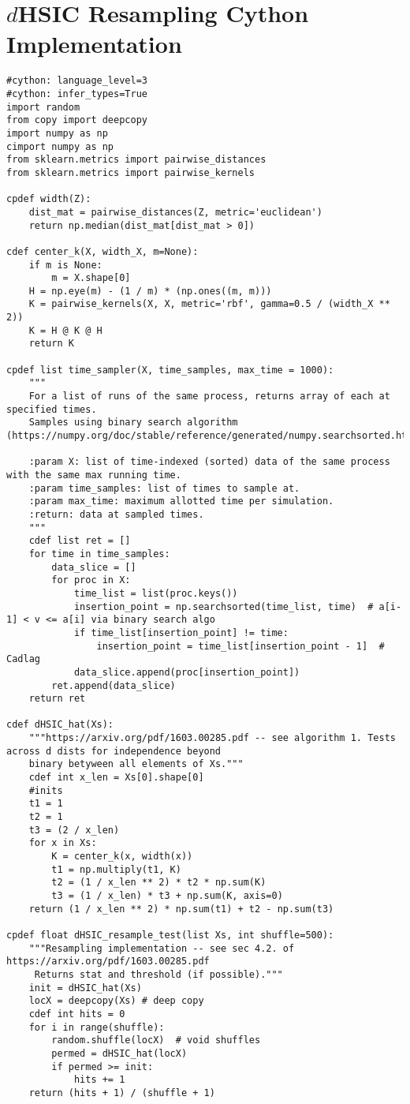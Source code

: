 
\chapter{$d$HSIC Resampling Cython Implementation}\label{sec:sic}

\begin{lstlisting}[label={lst:cyhsic}, language=Cython, style=mystyle]
#cython: language_level=3
#cython: infer_types=True
import random
from copy import deepcopy
import numpy as np
cimport numpy as np
from sklearn.metrics import pairwise_distances
from sklearn.metrics import pairwise_kernels

cpdef width(Z):
    dist_mat = pairwise_distances(Z, metric='euclidean')
    return np.median(dist_mat[dist_mat > 0])

cdef center_k(X, width_X, m=None):
    if m is None:
        m = X.shape[0]
    H = np.eye(m) - (1 / m) * (np.ones((m, m)))
    K = pairwise_kernels(X, X, metric='rbf', gamma=0.5 / (width_X ** 2))
    K = H @ K @ H
    return K

cpdef list time_sampler(X, time_samples, max_time = 1000):
    """
    For a list of runs of the same process, returns array of each at specified times.
    Samples using binary search algorithm (https://numpy.org/doc/stable/reference/generated/numpy.searchsorted.html).
    
    :param X: list of time-indexed (sorted) data of the same process with the same max running time.
    :param time_samples: list of times to sample at.
    :param max_time: maximum allotted time per simulation.
    :return: data at sampled times.
    """
    cdef list ret = []
    for time in time_samples:
        data_slice = []
        for proc in X:
            time_list = list(proc.keys())
            insertion_point = np.searchsorted(time_list, time)  # a[i-1] < v <= a[i] via binary search algo
            if time_list[insertion_point] != time:
                insertion_point = time_list[insertion_point - 1]  # Cadlag
            data_slice.append(proc[insertion_point])
        ret.append(data_slice)
    return ret

cdef dHSIC_hat(Xs):
    """https://arxiv.org/pdf/1603.00285.pdf -- see algorithm 1. Tests across d dists for independence beyond
    binary betyween all elements of Xs."""
    cdef int x_len = Xs[0].shape[0]
    #inits
    t1 = 1
    t2 = 1
    t3 = (2 / x_len)
    for x in Xs:
        K = center_k(x, width(x))
        t1 = np.multiply(t1, K)
        t2 = (1 / x_len ** 2) * t2 * np.sum(K)
        t3 = (1 / x_len) * t3 + np.sum(K, axis=0)
    return (1 / x_len ** 2) * np.sum(t1) + t2 - np.sum(t3)

cpdef float dHSIC_resample_test(list Xs, int shuffle=500):
    """Resampling implementation -- see sec 4.2. of https://arxiv.org/pdf/1603.00285.pdf
     Returns stat and threshold (if possible)."""
    init = dHSIC_hat(Xs)
    locX = deepcopy(Xs) # deep copy
    cdef int hits = 0
    for i in range(shuffle):
        random.shuffle(locX)  # void shuffles
        permed = dHSIC_hat(locX)
        if permed >= init:
            hits += 1
    return (hits + 1) / (shuffle + 1)
\end{lstlisting}

